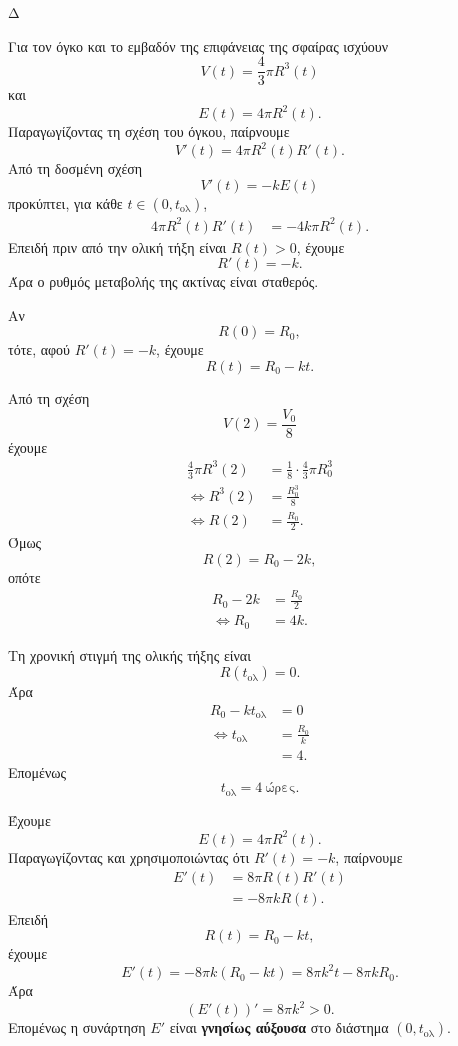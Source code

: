 \begin{thema}{Δ}
\begin{erwthma}
\item Για τον όγκο και το εμβαδόν της επιφάνειας της σφαίρας ισχύουν
\[
V(t)=\frac{4}{3}\pi R^3(t)
\]
και
\[
E(t)=4\pi R^2(t).
\]
Παραγωγίζοντας τη σχέση του όγκου, παίρνουμε
\[
V'(t)=4\pi R^2(t)R'(t).
\]
Από τη δοσμένη σχέση
\[
V'(t)=-kE(t)
\]
προκύπτει, για κάθε $t\in(0,t_{\mathrm{ολ}})$,
\begin{align*}
4\pi R^2(t)R'(t)
&=-4k\pi R^2(t).
\end{align*}
Επειδή πριν από την ολική τήξη είναι $R(t)>0$, έχουμε
\[
{R'(t)=-k}.
\]
Άρα ο ρυθμός μεταβολής της ακτίνας είναι σταθερός.

Αν
\[
R(0)=R_0,
\]
τότε, αφού $R'(t)=-k$, έχουμε
\[
{R(t)=R_0-kt}.
\]

\item Από τη σχέση
\[
V(2)=\frac{V_0}{8}
\]
έχουμε
\begin{align*}
\frac{4}{3}\pi R^3(2)
&=\frac{1}{8}\cdot\frac{4}{3}\pi R_0^3\\
\Leftrightarrow
R^3(2)&=\frac{R_0^3}{8}\\
\Leftrightarrow
R(2)&=\frac{R_0}{2}.
\end{align*}
Όμως
\[
R(2)=R_0-2k,
\]
οπότε
\begin{align*}
R_0-2k&=\frac{R_0}{2}\\
\Leftrightarrow
R_0&=4k.
\end{align*}

Τη χρονική στιγμή της ολικής τήξης είναι
\[
R(t_{\mathrm{ολ}})=0.
\]
Άρα
\begin{align*}
R_0-kt_{\mathrm{ολ}}&=0\\
\Leftrightarrow
t_{\mathrm{ολ}}&=\frac{R_0}{k}\\
&=4.
\end{align*}
Επομένως
\[
{t_{\mathrm{ολ}}=4\ \text{ώρες}}.
\]

\item Έχουμε
\[
E(t)=4\pi R^2(t).
\]
Παραγωγίζοντας και χρησιμοποιώντας ότι $R'(t)=-k$, παίρνουμε
\begin{align*}
E'(t)
&=8\pi R(t)R'(t)\\
&=-8\pi kR(t).
\end{align*}
Επειδή
\[
R(t)=R_0-kt,
\]
έχουμε
\[
E'(t)=-8\pi k(R_0-kt)
=8\pi k^2t-8\pi kR_0.
\]
Άρα
\[
\left(E'(t)\right)'=8\pi k^2>0.
\]
Επομένως η συνάρτηση $E'$ είναι \textbf{γνησίως αύξουσα} στο διάστημα $(0,t_{\mathrm{ολ}})$.


\end{erwthma}
\end{thema}
